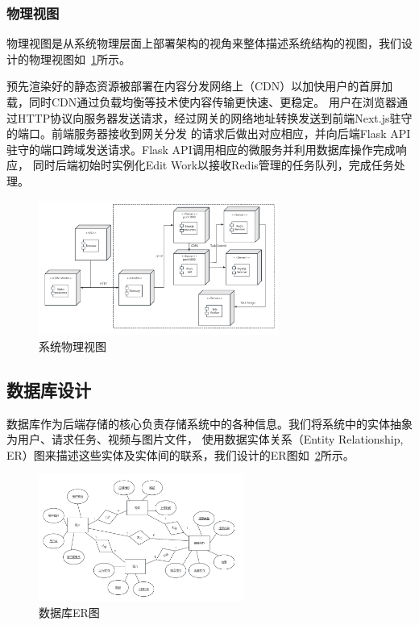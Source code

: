 \subsubsection{物理视图}

物理视图是从系统物理层面上部署架构的视角来整体描述系统结构的视图，我们设计的物理视图如~\ref{fig:system-deploy}所示。

预先渲染好的静态资源被部署在内容分发网络上（CDN）以加快用户的首屏加载，同时CDN通过负载均衡等技术使内容传输更快速、更稳定。
用户在浏览器通过HTTP协议向服务器发送请求，经过网关的网络地址转换发送到前端Next.js驻守的端口。前端服务器接收到网关分发
的请求后做出对应相应，并向后端Flask API驻守的端口跨域发送请求。Flask API调用相应的微服务并利用数据库操作完成响应，
同时后端初始时实例化Edit Work以接收Redis管理的任务队列，完成任务处理。

\begin{figure}[ht]
    \centering
    \includegraphics[width=0.7\textwidth]{source/img/system_deploy.png}
    \caption{系统物理视图}
    \label{fig:system-deploy}
\end{figure}

\subsection{数据库设计}

数据库作为后端存储的核心负责存储系统中的各种信息。我们将系统中的实体抽象为用户、请求任务、视频与图片文件，
使用数据实体关系（Entity Relationship, ER）图来描述这些实体及实体间的联系，我们设计的ER图如~\ref{fig:database-ER}所示。

\begin{figure}[ht]
    \centering
    \includegraphics[width=0.6\textwidth]{source/img/database_ER.png}
    \caption{数据库ER图}
    \label{fig:database-ER}
\end{figure}

